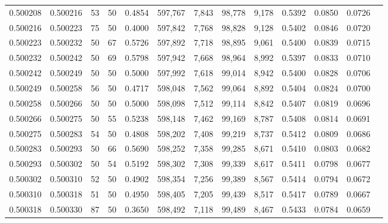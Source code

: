 \begin{tabular}{rrrrrrrrrrrrr}
0.500208 & 0.500216 &    53 &  50 &                                     0.4854 & 597,767 &   7,843 &  98,778 &   9,178 & 0.5392 & 0.0850 & 0.0726 \\
0.500216 & 0.500223 &    75 &  50 &                                     0.4000 & 597,842 &   7,768 &  98,828 &   9,128 & 0.5402 & 0.0846 & 0.0720 \\
0.500223 & 0.500232 &    50 &  67 &                                     0.5726 & 597,892 &   7,718 &  98,895 &   9,061 & 0.5400 & 0.0839 & 0.0715 \\
0.500232 & 0.500242 &    50 &  69 &                                     0.5798 & 597,942 &   7,668 &  98,964 &   8,992 & 0.5397 & 0.0833 & 0.0710 \\
0.500242 & 0.500249 &    50 &  50 &                                     0.5000 & 597,992 &   7,618 &  99,014 &   8,942 & 0.5400 & 0.0828 & 0.0706 \\
0.500249 & 0.500258 &    56 &  50 &                                     0.4717 & 598,048 &   7,562 &  99,064 &   8,892 & 0.5404 & 0.0824 & 0.0700 \\
0.500258 & 0.500266 &    50 &  50 &                                     0.5000 & 598,098 &   7,512 &  99,114 &   8,842 & 0.5407 & 0.0819 & 0.0696 \\
0.500266 & 0.500275 &    50 &  55 &                                     0.5238 & 598,148 &   7,462 &  99,169 &   8,787 & 0.5408 & 0.0814 & 0.0691 \\
0.500275 & 0.500283 &    54 &  50 &                                     0.4808 & 598,202 &   7,408 &  99,219 &   8,737 & 0.5412 & 0.0809 & 0.0686 \\
0.500283 & 0.500293 &    50 &  66 &                                     0.5690 & 598,252 &   7,358 &  99,285 &   8,671 & 0.5410 & 0.0803 & 0.0682 \\
0.500293 & 0.500302 &    50 &  54 &                                     0.5192 & 598,302 &   7,308 &  99,339 &   8,617 & 0.5411 & 0.0798 & 0.0677 \\
0.500302 & 0.500310 &    52 &  50 &                                     0.4902 & 598,354 &   7,256 &  99,389 &   8,567 & 0.5414 & 0.0794 & 0.0672 \\
0.500310 & 0.500318 &    51 &  50 &                                     0.4950 & 598,405 &   7,205 &  99,439 &   8,517 & 0.5417 & 0.0789 & 0.0667 \\
0.500318 & 0.500330 &    87 &  50 &                                     0.3650 & 598,492 &   7,118 &  99,489 &   8,467 & 0.5433 & 0.0784 & 0.0659 \\

\end{tabular}
